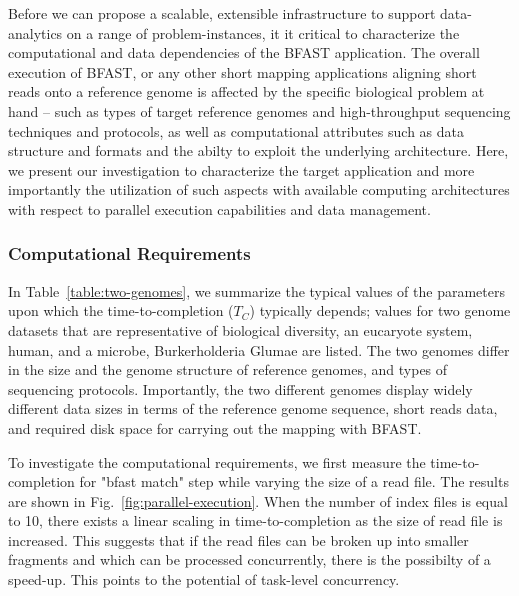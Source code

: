 \documentclass{acm_proc_article-sp}
\begin{document}
Before we can propose a scalable, extensible infrastructure to support
data-analytics on a range of problem-instances, it it critical to
characterize the computational and data dependencies of the BFAST
application.  The overall execution of BFAST, or any other short
mapping applications aligning short reads onto a reference genome is
affected by the specific biological problem at hand -- such as types
of target reference genomes and high-throughput sequencing techniques
and protocols, as well as computational attributes such as data
structure and formats and the abilty to exploit the underlying
architecture.  Here, we present our investigation to characterize the
target application and more importantly the utilization of such
aspects with available computing architectures with respect to
parallel execution capabilities and data management.

\subsubsection{Computational Requirements}


In Table~\ref{table:two-genomes}, we summarize the typical values of
the parameters upon which the time-to-completion ($T_C$) typically
depends; values for two genome datasets that are representative of
biological diversity, an eucaryote system, human, and a microbe,
Burkerholderia Glumae\cite{kim2011} are listed. The two genomes differ
in the size and the genome structure of reference genomes, and types
of sequencing protocols.  Importantly, the two different genomes
display widely different data sizes in terms of the reference genome
sequence, short reads data, and required disk space for carrying out
the mapping with BFAST.

To investigate the computational requirements, we first measure the
time-to-completion for "bfast match" step while varying the size of a
read file.  The results are shown in
Fig.~\ref{fig:parallel-execution}. When the number of index files is
equal to 10, there exists a linear scaling in time-to-completion as
the size of read file is increased.  This suggests that if the read
files can be broken up into smaller fragments and which can be
processed concurrently, there is the possibilty of a speed-up. This
points to the potential of task-level concurrency.
\end{document}
